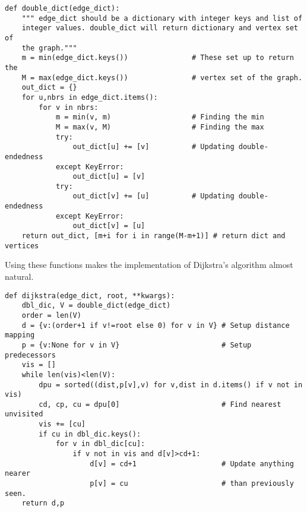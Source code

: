 \documentclass[m3380-lec-main.tex]{subfiles}
\begin{document}
\bc
\begin{verbatim}
def double_dict(edge_dict):
    """ edge_dict should be a dictionary with integer keys and list of 
    integer values. double_dict will return dictionary and vertex set of
    the graph."""
    m = min(edge_dict.keys())               # These set up to return the 
    M = max(edge_dict.keys())               # vertex set of the graph.
    out_dict = {}
    for u,nbrs in edge_dict.items():
        for v in nbrs:
            m = min(v, m)                   # Finding the min
            M = max(v, M)                   # Finding the max
            try:
                out_dict[u] += [v]          # Updating double-endedness
            except KeyError:
                out_dict[u] = [v]
            try:
                out_dict[v] += [u]          # Updating double-endedness
            except KeyError:
                out_dict[v] = [u]
    return out_dict, [m+i for i in range(M-m+1)] # return dict and vertices
\end{verbatim}
\ec
Using these functions makes the implementation of Dijkstra's algorithm almost natural.

\bc
\begin{verbatim}
def dijkstra(edge_dict, root, **kwargs):
    dbl_dic, V = double_dict(edge_dict)
    order = len(V)
    d = {v:(order+1 if v!=root else 0) for v in V} # Setup distance mapping
    p = {v:None for v in V}                        # Setup predecessors
    vis = []
    while len(vis)<len(V):
        dpu = sorted((dist,p[v],v) for v,dist in d.items() if v not in vis)
        cd, cp, cu = dpu[0]                        # Find nearest unvisited
        vis += [cu]
        if cu in dbl_dic.keys():
            for v in dbl_dic[cu]:
                if v not in vis and d[v]>cd+1:
                    d[v] = cd+1                    # Update anything nearer
                    p[v] = cu                      # than previously seen.
    return d,p
\end{verbatim}
\ec
\end{document}
